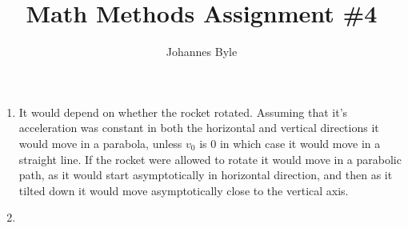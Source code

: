 \documentclass[12pt]{article}
\title{Math Methods Assignment \#4}
\author{Johannes Byle}
\begin{document}
  \maketitle
  \begin{enumerate}
    \item It would depend on whether the rocket rotated.
    Assuming that it's acceleration was constant in both the horizontal and vertical directions it would move in a parabola, unless $v_0$ is 0 in which case it would move in a straight line.
    If the rocket were allowed to rotate it would move in a parabolic path, as it would start asymptotically in horizontal direction, and then as it tilted down it would move asymptotically close to the vertical axis.
    \item
  \end{enumerate}
\end{document}
